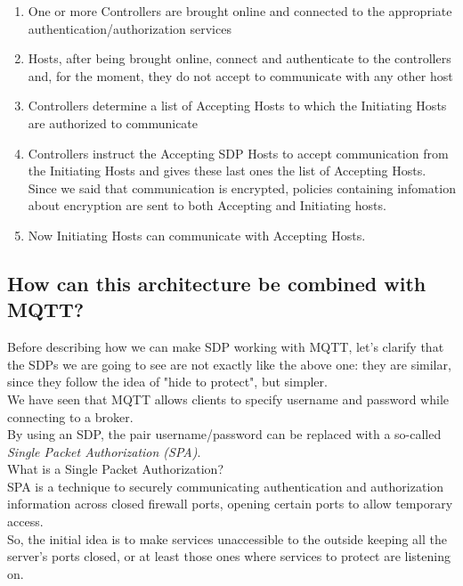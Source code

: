 \documentclass[12pt]{report}
\begin{document}
{\begin{enumerate}
\item One or more Controllers are brought online and connected to the appropriate authentication/authorization services
\item Hosts, after being brought online, connect and authenticate to the controllers and, for the moment, they do not accept to communicate with any other host
\item Controllers determine a list of Accepting Hosts to which the Initiating Hosts are authorized to communicate
\item Controllers instruct the Accepting SDP Hosts to accept communication from the Initiating Hosts and gives these last ones the list of Accepting Hosts.\\
Since we said that communication is encrypted, policies containing infomation about encryption are sent to both Accepting and Initiating hosts.
\item Now Initiating Hosts can communicate with Accepting Hosts.\\
\end{enumerate}

\subsection{How can this architecture be combined with MQTT?}
\bigskip
Before describing how we can make SDP working with MQTT, let's clarify that the SDPs we are going to see are not exactly like the above one: they are similar, since they follow the idea of "hide to protect", but simpler.\\

We have seen that MQTT allows clients to specify username and password while connecting to a broker.\\By using an SDP, the pair username/password can be replaced with a so-called \emph{Single Packet Authorization (SPA)}.\\

What is a Single Packet Authorization?\\

SPA is a technique to securely communicating authentication and authorization information across closed firewall ports, opening certain ports to allow temporary access.\\
So, the initial idea is to make services unaccessible to the outside keeping all the server's ports closed, or at least those ones where services to protect are listening on.\\

}
\end{document}
